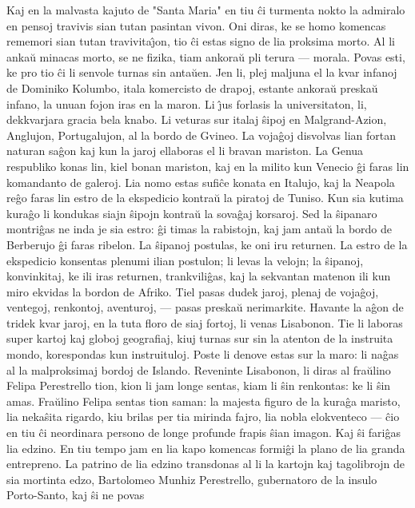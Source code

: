    Kaj en la malvasta kajuto de "Santa Maria" en tiu \^ci turmenta nokto
la admiralo en pensoj travivis sian tutan pasintan vivon. Oni diras,
ke se homo komencas rememori sian tutan travivita\^{\j}on, tio \^ci
estas signo de lia proksima morto. Al li anka\u u minacas morto, se
ne fizika, tiam ankora\u u pli terura --- morala. Povas esti, ke pro
tio \^ci li senvole turnas sin anta\u uen. Jen li, plej maljuna el
la kvar infanoj de Dominiko Kolumbo, itala komercisto de drapoj,
estante ankora\u u preska\u u infano, la unuan fojon iras en la
maron. Li \^{\j}us forlasis la universitaton, li, dekkvarjara gracia
bela knabo. Li veturas sur italaj \^sipoj en Malgrand-Azion,
Anglujon, Portugalujon, al la bordo de Gvineo. La voja\^goj
disvolvas lian fortan naturan sa\^gon kaj kun la jaroj ellaboras el
li bravan mariston. La Genua respubliko konas lin, kiel bonan
mariston, kaj en la milito kun Venecio \^gi faras lin komandanto de
galeroj. Lia nomo estas sufi\^ce konata en Italujo, kaj la Neapola
re\^go faras lin estro de la ekspedicio kontra\u u la piratoj de
Tuniso. Kun sia kutima kura\^go li kondukas siajn \^sipojn kontra\u
u la sova\^gaj korsaroj. Sed la \^sipanaro montri\^gas ne inda je
sia estro: \^gi timas la rabistojn, kaj jam anta\u u la bordo de
Berberujo \^gi faras ribelon. La \^sipanoj postulas, ke oni iru
returnen. La estro de la ekspedicio konsentas plenumi ilian
postulon; li levas la velojn; la \^sipanoj, konvinkitaj, ke ili iras
returnen, trankvili\^gas, kaj la sekvantan matenon ili kun miro
ekvidas la bordon de Afriko. Tiel pasas dudek jaroj, plenaj de
voja\^goj, ventegoj, renkontoj, aventuroj, --- pasas preska\u u
nerimarkite. Havante la a\^gon de tridek kvar jaroj, en la tuta
floro de siaj fortoj, li venas Lisabonon. Tie li laboras super
kartoj kaj globoj geografiaj, kiuj turnas sur sin la atenton de la
instruita mondo, korespondas kun instruituloj. Poste li denove estas
sur la maro: li na\^gas al la malproksimaj bordoj de Islando.
Reveninte Lisabonon, li diras al fra\u ulino Felipa Perestrello
tion, kion li jam longe sentas, kiam li \^sin renkontas: ke li \^sin
amas. Fra\u ulino Felipa sentas tion saman: la majesta figuro de la
kura\^ga maristo, lia neka\^sita rigardo, kiu brilas per tia mirinda
fajro, lia nobla elokventeco --- \^cio en tiu \^ci neordinara
persono de longe profunde frapis \^sian imagon. Kaj \^si fari\^gas
lia edzino. En tiu tempo jam en lia kapo komencas formi\^gi la plano
de lia granda entrepreno. La patrino de lia edzino transdonas al li
la kartojn kaj tagolibrojn de sia mortinta edzo, Bartolomeo Munhiz
Perestrello, gubernatoro de la insulo Porto-Santo, kaj \^si ne povas
